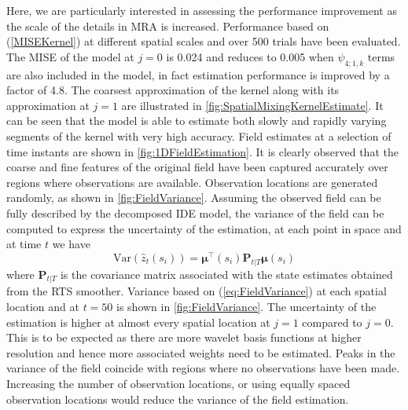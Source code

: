 \documentclass[journal,a4paper]{IEEEtran}
\begin{document}
  Here, we are particularly interested in assessing the performance improvement as the scale of the details in MRA is increased. Performance based on (\ref{MISEKernel}) at different spatial scales and over 500 trials have been evaluated. The MISE of the model at $j=0$ is 0.024 and reduces to 0.005 when $\psi_{4;1,k}$ terms are also included in the model, in fact estimation performance is improved by a factor of 4.8. The coarsest approximation of the kernel along with its approximation at $j=1$ are illustrated in \figurename{\ref{fig:SpatialMixingKernelEstimate}. It can be seen that the model is able to estimate both slowly and rapidly varying segments of the  kernel with very high accuracy.  Field estimates  at a selection of time instants are shown in \figurename{\ref{fig:1DFieldEstimation}}. It is clearly observed that the coarse and fine features of the original field have been captured accurately over regions where observations are available. Observation locations are generated randomly, as shown in \figurename{ \ref{fig:FieldVariance}}. Assuming the observed field can be fully described by the  decomposed IDE model, the variance of the field can be computed to express the  uncertainty of the estimation, at each point in space and at time $t$ we have 
\begin{equation}
 \text{Var}(\hat z_t(s_i))=\boldsymbol\mu^{\top}(s_i) \mathbf P_{t|T}\boldsymbol\mu(s_i)
\label{eq:FieldVariance}
\end{equation}
where $\mathbf P_{t|T} $ is the covariance matrix associated with the  state estimates obtained from the RTS smoother. Variance based on (\ref{eq:FieldVariance}) at each spatial location and at $t=50$ is shown in \figurename{\ref{fig:FieldVariance}}. The uncertainty of the estimation is higher at almost  every spatial location at $j=1$ compared to $j=0$. This is to be expected as there are more wavelet basis functions at higher resolution and hence more associated weights need to be estimated. Peaks in the variance of the field coincide with regions where no observations have been made. Increasing the number of observation locations, or using equally spaced observation locations would reduce the variance of the field estimation.
}
\end{document}
